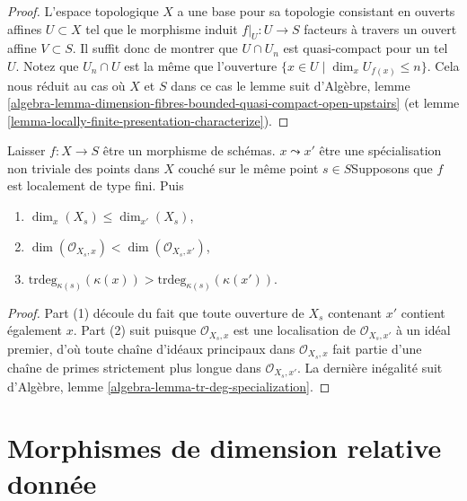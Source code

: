 \begin{proof}

L'espace topologique $X$ a une base pour sa topologie consistant en ouverts affines $U \subset X$ tel que le morphisme induit
$f|_U : U \to S$ facteurs à travers un ouvert affine $V \subset S$. Il suffit donc de montrer que $U \cap U_n$ est quasi-compact pour un tel $U$. Notez que $U_n \cap U$ est la même que l'ouverture
$\{x \in U \mid \dim_x U_{f(x)} \leq n\}$. Cela nous réduit au cas où $X$ et $S$ dans ce cas le lemme suit d'Algèbre, lemme \ref{algebra-lemma-dimension-fibres-bounded-quasi-compact-open-upstairs}
(et lemme \ref{lemma-locally-finite-presentation-characterize}).

\end{proof}

\begin{lemma}

\label{lemma-dimension-fibre-specialization}

Laisser $f : X \to S$ être un morphisme de schémas. $x \leadsto x'$ être une spécialisation non triviale des points dans $X$
couché sur le même point $s \in S$Supposons que $f$ est localement de type fini. Puis

\begin{enumerate}

\item  $\dim_x(X_s) \leq \dim_{x'}(X_s)$,
\item  $\dim(\mathcal{O}_{X_s, x}) < \dim(\mathcal{O}_{X_s, x'})$,
\item  $\text{trdeg}_{\kappa(s)}(\kappa(x)) >
\text{trdeg}_{\kappa(s)}(\kappa(x'))$.

\end{enumerate}

\end{lemma}

\begin{proof}
Part (1) découle du fait que toute ouverture de $X_s$ contenant $x'$ contient également $x$. Part (2) suit puisque $\mathcal{O}_{X_s, x}$ est une localisation de $\mathcal{O}_{X_s, x'}$ à un idéal premier, d'où toute chaîne d'idéaux principaux dans $\mathcal{O}_{X_s, x}$ fait partie d'une chaîne de primes strictement plus longue dans $\mathcal{O}_{X_s, x'}$. La dernière inégalité suit d'Algèbre, lemme \ref{algebra-lemma-tr-deg-specialization}.
\end{proof}






\section{Morphismes de dimension relative donnée}
\label{section-relative-dimension}

